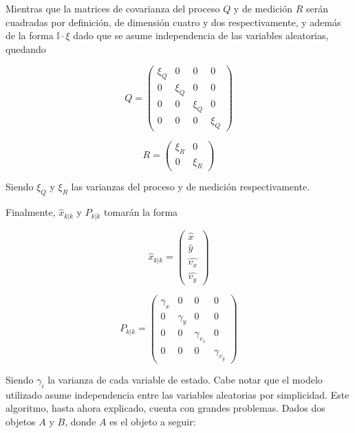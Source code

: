 Mientras que la matrices de covarianza del proceso $Q$ y de medición $R$ serán cuadradas por definición, de dimensión cuatro y dos respectivamente, y además de la forma $\mathbb{I}\cdot \xi$ dado que se asume independencia de las variables aleatorias, quedando

\begin{equation}
Q = 
\begin{pmatrix}
\xi_Q & 0 & 0  & 0\\
0 & \xi_Q  & 0 & 0\\
0 & 0  & \xi_Q  & 0\\
0 & 0  & 0  & \xi_Q 
\end{pmatrix}
\end{equation}

\begin{equation}
R = 
\begin{pmatrix}
\xi_R & 0 \\
0 & \xi_R 
\end{pmatrix}
\end{equation}

Siendo $\xi_Q$ y $\xi_R$ las varianzas del proceso y de medición respectivamente.

Finalmente, $\hat{x}_{k|k}$ y $P_{k|k}$ tomarán la forma

\begin{equation}
\hat{x}_{k|k} = 
\begin{pmatrix}
\hat{x}\\
\hat{y}\\
\hat{v_x}\\
\hat{v_y}
\end{pmatrix}
\end{equation}

\begin{equation}
P_{k|k} = 
\begin{pmatrix}
\gamma_{x} & 0 & 0  & 0\\
0 & \gamma_{y}  & 0 & 0\\
0 & 0  & \gamma_{v_x}  & 0\\
0 & 0  & 0  & \gamma_{v_y} 
\end{pmatrix}
\end{equation}

Siendo $\gamma_{i}$ la varianza de cada variable de estado. Cabe notar que el modelo utilizado asume independencia entre las variables aleatorias por simplicidad.
Este algoritmo, hasta ahora explicado, cuenta con grandes problemas. Dados dos objetos $A$ y $B$, donde $A$ es el objeto a seguir:

